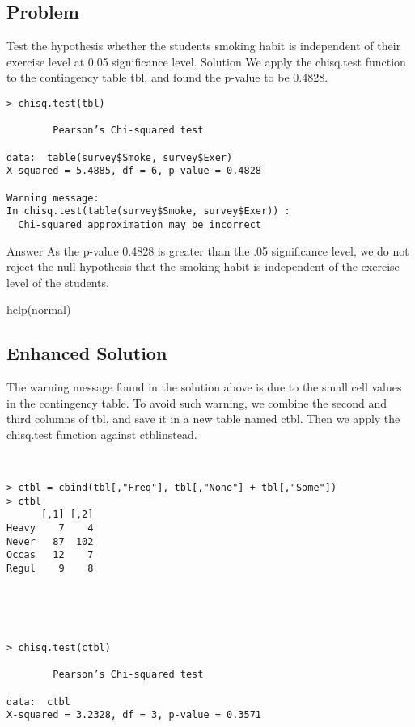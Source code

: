 \subsection{Problem}
Test the hypothesis whether the students smoking habit is independent of their exercise level at 0.05 significance level.
Solution
We apply the chisq.test function to the contingency table tbl, and found the p-value to be 0.4828.
\begin{framed}
\begin{verbatim}
> chisq.test(tbl) 
 
        Pearson’s Chi-squared test 
 
data:  table(survey$Smoke, survey$Exer) 
X-squared = 5.4885, df = 6, p-value = 0.4828 
 
Warning message: 
In chisq.test(table(survey$Smoke, survey$Exer)) : 
  Chi-squared approximation may be incorrect
\end{verbatim}
\end{framed}
Answer
As the p-value 0.4828 is greater than the .05 significance level, we do not reject the null hypothesis that the smoking habit is independent of the exercise level of the students.

help(normal)


\subsection{Enhanced Solution}
The warning message found in the solution above is due to the small cell values in the contingency table. To avoid such warning, we combine the second and third columns of tbl, and save it in a new table named ctbl. Then we apply the chisq.test function against ctblinstead.
 \begin{framed}
 \begin{verbatim}
> ctbl = cbind(tbl[,"Freq"], tbl[,"None"] + tbl[,"Some"]) 
> ctbl 
      [,1] [,2] 
Heavy    7    4 
Never   87  102 
Occas   12    7 
Regul    9    8 
\end{verbatim}
\end{framed}

 \begin{framed}
 \begin{verbatim}
> chisq.test(ctbl) 
 
        Pearson’s Chi-squared test 
 
data:  ctbl 
X-squared = 3.2328, df = 3, p-value = 0.3571

\end{verbatim}
\end{framed}


